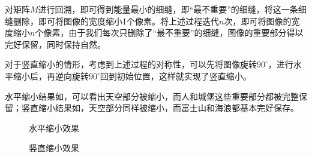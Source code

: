 \documentclass[11pt,a4paper]{article}
\begin{document}
对矩阵$M$进行回溯，即可得到能量最小的细缝，即“最不重要”的细缝，将这一条细缝删除，即可将图像的宽度缩小1个像素。将上述过程迭代$n$次，即可将图像的宽度缩小$n$个像素，由于我们每次只删除了“最不重要”的细缝，图像的重要部分得以完好保留，同时保持自然。

对于竖直缩小的情形，考虑到上述过程的对称性，可以先将图像旋转$90^\circ$，进行水平缩小后，再逆向旋转$90^\circ$回到初始位置，这样就实现了竖直缩小。

水平缩小结果如，可以看出天空部分被缩小，而人和城堡这些重要部分都被完整保留；竖直缩小结果如，天空部分同样被缩小，而富士山和海浪都基本完好保存。

\begin{figure}[H]
    \centering
    \caption{水平缩小效果}
    \label{fig:narrow_x}
\end{figure}

\begin{figure}[H]
    \centering
    \caption{竖直缩小效果}
    \label{fig:narrow_y}
\end{figure}
\end{document}
